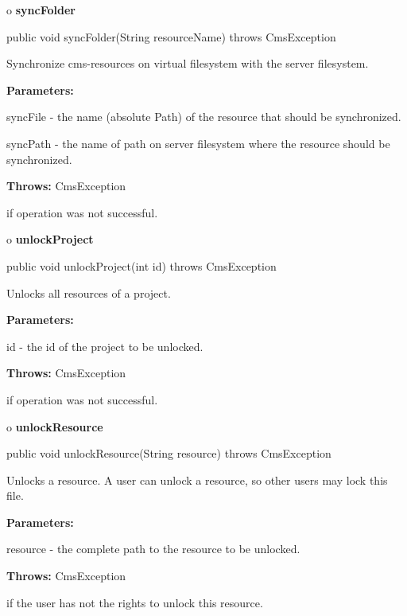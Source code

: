 o {\bf syncFolder}

\begin{PRE}
 public void syncFolder(String resourceName) throws CmsException
\end{PRE}

\begin{description}
\htmlDD Synchronize cms-resources on virtual filesystem with the server
filesystem.

\begin{description}
\item {\bf Parameters:}

syncFile - the name (absolute Path) of the resource that should be
synchronized.

syncPath - the name of path on server filesystem where the resource should be
synchronized.
\item {\bf Throws:} CmsException

if operation was not successful.
\end{description}

\end{description}

o {\bf unlockProject}

\begin{PRE}
 public void unlockProject(int id) throws CmsException
\end{PRE}

\begin{description}
\htmlDD Unlocks all resources of a project.

\begin{description}
\item {\bf Parameters:}

id - the id of the project to be unlocked.
\item {\bf Throws:} CmsException

if operation was not successful.
\end{description}

\end{description}

o {\bf unlockResource}

\begin{PRE}
 public void unlockResource(String resource) throws CmsException
\end{PRE}

\begin{description}
\htmlDD Unlocks a resource. \htmlBR
A user can unlock a resource, so other users may lock this file.

\begin{description}
\item {\bf Parameters:}

resource - the complete path to the resource to be unlocked.
\item {\bf Throws:} CmsException

if the user has not the rights to unlock this resource.
\end{description}

\end{description}


